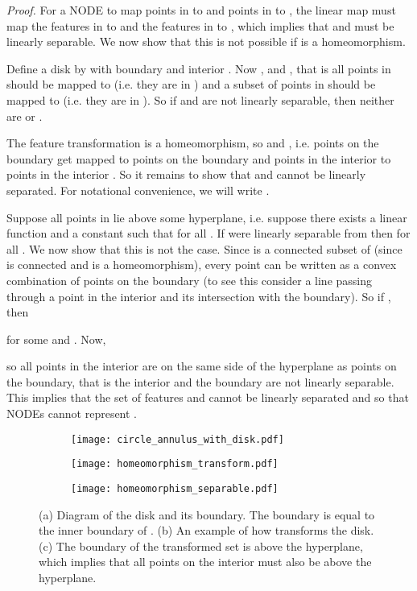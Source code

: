 \documentclass{article}
\begin{document}
\textit{Proof.} For a NODE to map points in  to  and points in  to , the linear map  must map the features in  to  and the features in  to , which implies that  and  must be linearly separable. We now show that this is not possible if  is a homeomorphism.

Define a disk  by  with boundary  and interior . Now ,  and , that is all points in  should be mapped to  (i.e. they are in ) and a subset of points in  should be mapped to  (i.e. they are in ). So if  and  are not linearly separable, then neither are  or . 

The feature transformation  is a homeomorphism, so  and , i.e. points on the boundary get mapped to points on the boundary and points in the interior to points in the interior \citep{armstrong2013basic}. So it remains to show that  and  cannot be linearly separated. For notational convenience, we will write .

Suppose all points in  lie above some hyperplane, i.e. suppose there exists a linear function  and a constant  such that  for all . If  were linearly separable from  then  for all . We now show that this is not the case. Since  is a connected subset of  (since  is connected and  is a homeomorphism), every point  can be written as a convex combination of points on the boundary  (to see this consider a line passing through a point  in the interior and its intersection with the boundary). So if , then



for some  and . Now,



so all points in the interior are on the same side of the hyperplane as points on the boundary, that is the interior and the boundary are not linearly separable. This implies that the set of features  and  cannot be linearly separated and so that NODEs cannot represent .

\begin{figure}[h]
\centering
\begin{subfigure}[t]{0.2\linewidth}
\centering
\texttt{[image: circle\_annulus\_with\_disk.pdf]}
\caption{}
\end{subfigure}\hspace{0.05\linewidth}
\begin{subfigure}[t]{0.4\linewidth}
\centering
\texttt{[image: homeomorphism\_transform.pdf]}
\caption{}
\end{subfigure}\hspace{0.02\linewidth}
\begin{subfigure}[t]{0.3\linewidth}
\centering
\texttt{[image: homeomorphism\_separable.pdf]}
\caption{}
\end{subfigure}
\caption{(a) Diagram of the disk  and its boundary. The boundary is equal to the inner boundary of . (b) An example of how  transforms the disk. (c) The boundary of the transformed set is above the hyperplane, which implies that all points on the interior must also be above the hyperplane.}
\end{figure}
\end{document}
